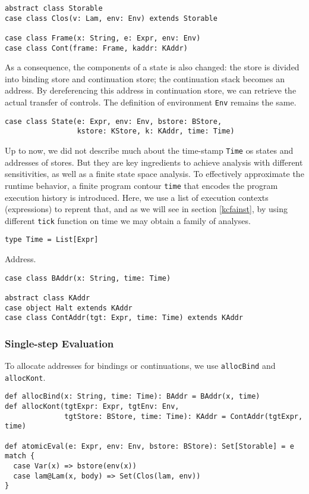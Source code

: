 \documentclass[acmsmall,review,anonymous]{acmart}\settopmatter{printfolios=true,printccs=false,printacmref=false}
\begin{document}
\begin{verbatim}
abstract class Storable 
case class Clos(v: Lam, env: Env) extends Storable

case class Frame(x: String, e: Expr, env: Env)
case class Cont(frame: Frame, kaddr: KAddr)
\end{verbatim}

As a consequence, the components of a state is also changed: 
the store is divided into binding store and continuation store;
the continuation stack becomes an address.
By dereferencing this address in continuation store, we can retrieve the 
actual transfer of controls. The definition of environment \texttt{Env}
remains the same.

\begin{verbatim}
case class State(e: Expr, env: Env, bstore: BStore, 
                 kstore: KStore, k: KAddr, time: Time)
\end{verbatim}

Up to now, we did not describe much about the time-stamp \texttt{Time}
os states and addresses of stores.
But they are key ingredients to achieve analysis with different sensitivities,
as well as a finite state space analysis.
To effectively approximate the runtime behavior, a finite 
program contour \texttt{time} that encodes the program execution history is introduced.
Here, we use a list of execution contexts (expressions) to reprent that, and
as we will see in section \ref{kcfainst}, by using different \texttt{tick}
function on time we may obtain a family of analyses.

\begin{verbatim}
type Time = List[Expr]
\end{verbatim}

Address.

\begin{verbatim}
case class BAddr(x: String, time: Time)

abstract class KAddr
case object Halt extends KAddr
case class ContAddr(tgt: Expr, time: Time) extends KAddr
\end{verbatim}

\subsubsection{Single-step Evaluation}

To allocate addresses for bindings or continuations, we use \texttt{allocBind}
and \texttt{allocKont}.

\begin{verbatim}
def allocBind(x: String, time: Time): BAddr = BAddr(x, time)
def allocKont(tgtExpr: Expr, tgtEnv: Env, 
              tgtStore: BStore, time: Time): KAddr = ContAddr(tgtExpr, time)

def atomicEval(e: Expr, env: Env, bstore: BStore): Set[Storable] = e match {
  case Var(x) => bstore(env(x))
  case lam@Lam(x, body) => Set(Clos(lam, env))
}
\end{verbatim}
\end{document}
